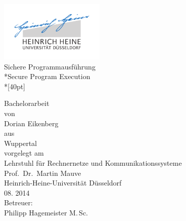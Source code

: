 
\begin{titlepage}
  \centering
  \includegraphics[width=5cm]{fig/unilogo}\\

  \vfill
  \huge
  Sichere Programmausführung\\*Secure Program Execution\\*[40pt]
  \normalsize

  \vfill
  \large
  Bachelorarbeit\\[0.25em]
  \normalsize
  von\\
  \Large
  Dorian Eikenberg\\

  \vspace{5mm}
  \normalsize
  aus\\ Wuppertal\\[1cm]
  vorgelegt am\\[5mm]
  Lehrstuhl für Rechnernetze und Kommunikationssysteme\\
  Prof.\ Dr.\ Martin Mauve\\ 
  Heinrich-Heine-Universität Düsseldorf\\[0.5cm]
  08. 2014\\[0.5cm]
  Betreuer:\\
  Philipp Hagemeister M.\,Sc.
    
\end{titlepage}


